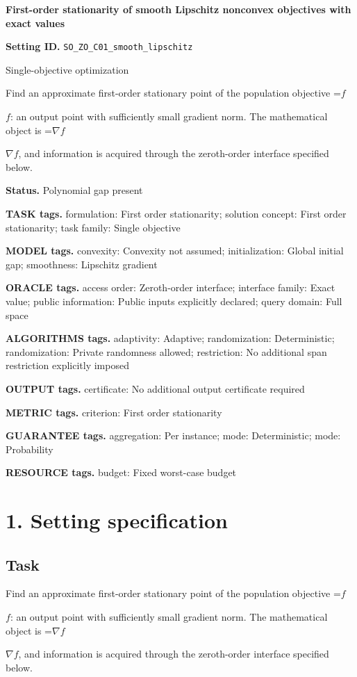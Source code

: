 \documentclass[10pt,a4paper]{article}
\newcommand{\AtlasMath}[1]{\par\begingroup\centering\setbox0=\hbox{$\displaystyle #1$}\ifdim\wd0>1.4\linewidth\typeout{ATLAS WIDE FORMULA: \the\wd0}\fi\ifdim\wd0>\linewidth\resizebox{\linewidth}{!}{\box0}\else\box0\fi\par\endgroup}
\newcommand{\AtlasInlineMath}[1]{\begingroup\setbox0=\hbox{$#1$}\ifdim\wd0>.4\linewidth\endgroup\AtlasMath{#1}\else\endgroup$#1$\fi}
\begin{document}
\raggedright

{\LARGE\bfseries\sffamily\color{AtlasNavy} First-order stationarity of smooth Lipschitz nonconvex objectives with exact values\par}\vspace{5pt}
\textbf{Setting ID.} \texttt{SO\_\allowbreak{}ZO\_\allowbreak{}C01\_\allowbreak{}smooth\_\allowbreak{}lipschitz}

Single-objective optimization

Find an approximate first-order stationary point of the population objective \AtlasInlineMath{f}: an output point with sufficiently small gradient norm. The mathematical object is \AtlasInlineMath{\nabla f}, and information is acquired through the zeroth-order interface specified below.

\textbf{Status.} Polynomial gap present

\textbf{TASK tags.} formulation: First order stationarity; solution concept: First order stationarity; task family: Single objective

\textbf{MODEL tags.} convexity: Convexity not assumed; initialization: Global initial gap; smoothness: Lipschitz gradient

\textbf{ORACLE tags.} access order: Zeroth-order interface; interface family: Exact value; public information: Public inputs explicitly declared; query domain: Full space

\textbf{ALGORITHMS tags.} adaptivity: Adaptive; randomization: Deterministic; randomization: Private randomness allowed; restriction: No additional span restriction explicitly imposed

\textbf{OUTPUT tags.} certificate: No additional output certificate required

\textbf{METRIC tags.} criterion: First order stationarity

\textbf{GUARANTEE tags.} aggregation: Per instance; mode: Deterministic; mode: Probability

\textbf{RESOURCE tags.} budget: Fixed worst-case budget

\section{1. Setting specification}
\subsection{Task}
Find an approximate first-order stationary point of the population objective \AtlasInlineMath{f}: an output point with sufficiently small gradient norm. The mathematical object is \AtlasInlineMath{\nabla f}, and information is acquired through the zeroth-order interface specified below.
\end{document}
